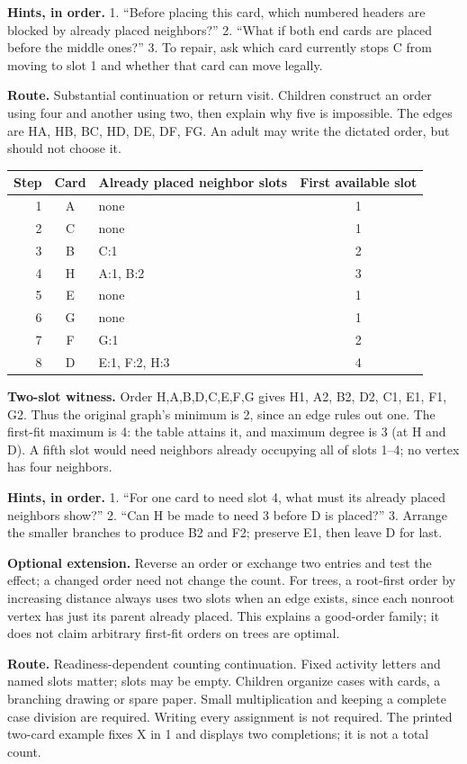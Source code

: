\documentclass[10pt,letterpaper]{article}
\newcommand{\topic}[1]{\vspace{3pt}{\large\bfseries #1}\par}
\newcommand{\labelled}[2]{\textbf{#1} #2\par}
\newcommand{\hint}[1]{\textbf{Hints, in order.} #1\par}
\newcommand{\route}[1]{\textbf{Route.} #1\par}
\begin{document}
\hint{1. ``Before placing this card, which numbered headers are blocked by already placed neighbors?'' 2. ``What if both end cards are placed before the middle ones?'' 3. To repair, ask which card currently stops C from moving to slot 1 and whether that card can move legally.}
\topic{Student p. 8 / Problem 8: a tree can force first-fit to four}
\route{Substantial continuation or return visit. Children construct an order using four and another using two, then explain why five is impossible. The edges are HA, HB, BC, HD, DE, DF, FG. An adult may write the dictated order, but should not choose it.}
\begin{tabularx}{\linewidth}{@{}r c X c@{}}
\toprule
Step & Card & Already placed neighbor slots & First available slot \\
\midrule
1 & A & none & 1 \\
2 & C & none & 1 \\
3 & B & C:1 & 2 \\
4 & H & A:1, B:2 & 3 \\
5 & E & none & 1 \\
6 & G & none & 1 \\
7 & F & G:1 & 2 \\
8 & D & E:1, F:2, H:3 & 4 \\
\bottomrule
\end{tabularx}\par\smallskip
\labelled{Two-slot witness.}{Order H,A,B,D,C,E,F,G gives H1, A2, B2, D2, C1, E1, F1, G2. Thus the original graph's minimum is 2, since an edge rules out one. The first-fit maximum is 4: the table attains it, and maximum degree is 3 (at H and D). A fifth slot would need neighbors already occupying all of slots 1--4; no vertex has four neighbors.}
\hint{1. ``For one card to need slot 4, what must its already placed neighbors show?'' 2. ``Can H be made to need 3 before D is placed?'' 3. Arrange the smaller branches to produce B2 and F2; preserve E1, then leave D for last.}
\labelled{Optional extension.}{Reverse an order or exchange two entries and test the effect; a changed order need not change the count. For trees, a root-first order by increasing distance always uses two slots when an edge exists, since each nonroot vertex has just its parent already placed. This explains a good-order family; it does not claim arbitrary first-fit orders on trees are optimal.}
\newpage
\topic{Student p. 9 / Problem 9: count fixed-label assignments}
\route{Readiness-dependent counting continuation. Fixed activity letters and named slots matter; slots may be empty. Children organize cases with cards, a branching drawing or spare paper. Small multiplication and keeping a complete case division are required. Writing every assignment is not required. The printed two-card example fixes X in 1 and displays two completions; it is not a total count.}
\end{document}
